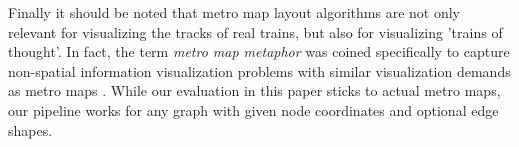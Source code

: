 \documentclass[sigconf]{acmart}
\begin{document}
Finally it should be noted that metro map layout algorithms are not only relevant for visualizing the tracks of real trains, but also for visualizing 'trains of thought'. In fact, the term \emph{metro map metaphor} was coined specifically to capture non-spatial information visualization problems with similar visualization demands as metro maps \cite{sandvad2001metro,nesbitt2004getting,stott2005automatic}. While our evaluation in this paper sticks to actual metro maps, our pipeline works for any graph with given node coordinates and optional edge shapes.
%



\end{document}
